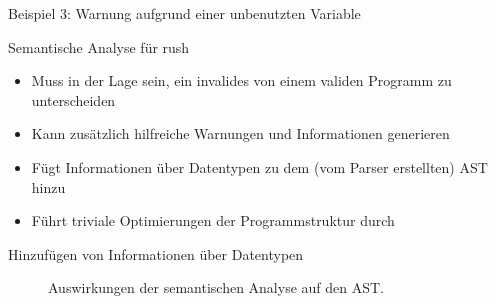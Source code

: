 \begin{frame}{Beispiel 3: Warnung aufgrund einer unbenutzten Variable}
	\begin{minipage}{.5\textwidth}
	\end{minipage}%
	\begin{minipage}{.5\textwidth}
	\end{minipage}
\end{frame}

\begin{frame}{Semantische Analyse für rush}
	\begin{itemize}
		\item Muss in der Lage sein, ein invalides von einem validen Programm zu unterscheiden
		\item Kann zusätzlich hilfreiche Warnungen und Informationen generieren
		\item Fügt Informationen über Datentypen zu dem (vom Parser erstellten) AST hinzu
		\item Führt triviale Optimierungen der Programmstruktur durch
	\end{itemize}
\end{frame}

\begin{frame}{Hinzufügen von Informationen über Datentypen}

	\begin{figure}[h]
		\begin{adjustbox}{max totalsize={\textwidth}{!},center}
        \end{adjustbox}
		\caption{Auswirkungen der semantischen Analyse auf den AST.}\label{fig:analysis_tree_conv}
	\end{figure}
\end{frame}
